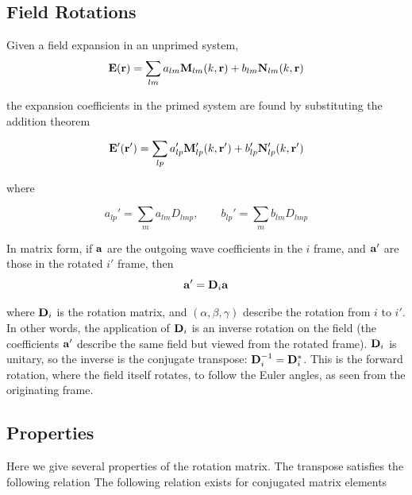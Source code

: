 \subsection{Field Rotations} 

Given a field expansion in an unprimed system, 
\begin{equation}
\mathbf{E}(\mathbf{r}) = \sum_{lm}a_{lm}\mathbf{M}_{lm}(k,\mathbf{r})+b_{lm}\mathbf{N}_{lm}(k,\mathbf{r})
\end{equation}

the expansion coefficients in the primed system are found by substituting the addition theorem 

\begin{equation}
\mathbf{E}'(\mathbf{r}') = \sum_{lp}a_{lp}'\mathbf{M}_{lp}'(k,\mathbf{r}')+b_{lp}'\mathbf{N}_{lp}'(k,\mathbf{r}')
\end{equation}

\noindent where 

\begin{equation}
a_{lp}' = \sum_m a_{lm}D_{lmp}, \quad \quad
b_{lp}' = \sum_m b_{lm}D_{lmp}
\end{equation}

In matrix form, if $\mathbf{a}$ are the outgoing wave coefficients in the $i$ frame, and $\mathbf{a}'$ are those in the rotated $i'$ frame, then 
\begin{equation}
\mathbf{a}' = \mathbf{D}_i\mathbf{a}
\end{equation}

\noindent where $\mathbf{D}_i$ is the rotation matrix, and $(\alpha,\beta,\gamma)$ describe the rotation from $i$ to $i'$.  In other words, the application of $\mathbf{D}_i$ is an inverse rotation on the field (the coefficients $\mathbf{a}'$ describe the same field but viewed from the rotated frame). $\mathbf{D}_i$ is unitary, so the inverse is the conjugate transpose: $\mathbf{D}_i^{-1} = \mathbf{D}^*_i$.  This is the forward rotation, where the field itself rotates, to follow the Euler angles, as seen from the originating frame. 

%


\subsection{Properties} 

Here we give several properties of the rotation matrix. The transpose satisfies the following relation
The following relation exists for conjugated matrix elements


